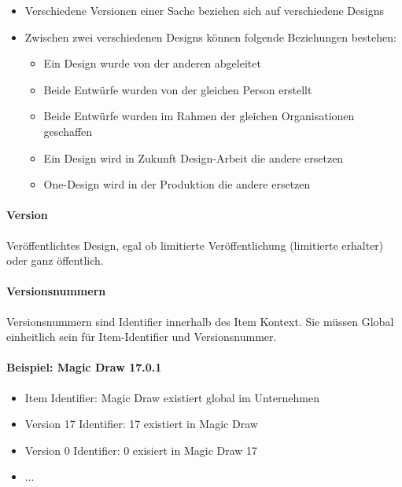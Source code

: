 \begin{itemize}
\item Verschiedene Versionen einer Sache beziehen sich auf verschiedene Designs 
\item
{Zwischen zwei verschiedenen Designs können folgende Beziehungen bestehen:
\begin{itemize}
\item Ein Design wurde von der anderen abgeleitet 
\item Beide Entwürfe wurden von der gleichen Person erstellt 
\item Beide Entwürfe wurden im Rahmen der gleichen Organisationen geschaffen 
\item Ein Design wird in Zukunft Design-Arbeit die andere ersetzen 
\item One-Design wird in der Produktion die andere ersetzen 
\end{itemize}
}
\end{itemize}


\newpage
\paragraph{Version}
Veröffentlichtes Design, egal ob limitierte Veröffentlichung (limitierte erhalter) oder ganz öffentlich.


\paragraph{Versionsnummern}
Versionsnummern sind Identifier innerhalb des Item Kontext. Sie müssen Global einheitlich sein für Item-Identifier und Versionsnummer.


\newpage
\paragraph{Beispiel: Magic Draw 17.0.1}

\begin{itemize}
\item Item Identifier: Magic Draw existiert global im Unternehmen
\item Version 17 Identifier: 17 existiert in Magic Draw
\item Version 0 Identifier: 0 exisiert in Magic Draw 17
\item ...
\end{itemize}

